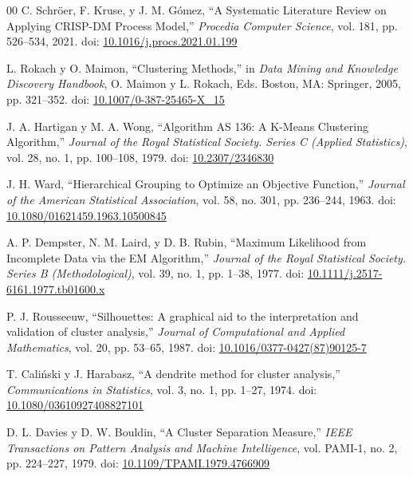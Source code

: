 \documentclass[conference,10pt,letterpaper]{IEEEtran}
\begin{document}
\begin{thebibliography}{00}
 C. Schröer, F. Kruse, y J. M. Gómez, ``A Systematic Literature Review on Applying CRISP-DM Process Model,'' \textit{Procedia Computer Science}, vol. 181, pp. 526--534, 2021. doi: \href{https://doi.org/10.1016/j.procs.2021.01.199}{10.1016/j.procs.2021.01.199}

 L. Rokach y O. Maimon, ``Clustering Methods,'' in \textit{Data Mining and Knowledge Discovery Handbook}, O. Maimon y L. Rokach, Eds. Boston, MA: Springer, 2005, pp. 321--352. doi: \href{https://doi.org/10.1007/0-387-25465-X_15}{10.1007/0-387-25465-X\_15}

 J. A. Hartigan y M. A. Wong, ``Algorithm AS 136: A K-Means Clustering Algorithm,'' \textit{Journal of the Royal Statistical Society. Series C (Applied Statistics)}, vol. 28, no. 1, pp. 100--108, 1979. doi: \href{https://doi.org/10.2307/2346830}{10.2307/2346830}

 J. H. Ward, ``Hierarchical Grouping to Optimize an Objective Function,'' \textit{Journal of the American Statistical Association}, vol. 58, no. 301, pp. 236--244, 1963. doi: \href{https://doi.org/10.1080/01621459.1963.10500845}{10.1080/01621459.1963.10500845}

 A. P. Dempster, N. M. Laird, y D. B. Rubin, ``Maximum Likelihood from Incomplete Data via the EM Algorithm,'' \textit{Journal of the Royal Statistical Society. Series B (Methodological)}, vol. 39, no. 1, pp. 1--38, 1977. doi: \href{https://doi.org/10.1111/j.2517-6161.1977.tb01600.x}{10.1111/j.2517-6161.1977.tb01600.x}

 P. J. Rousseeuw, ``Silhouettes: A graphical aid to the interpretation and validation of cluster analysis,'' \textit{Journal of Computational and Applied Mathematics}, vol. 20, pp. 53--65, 1987. doi: \href{https://doi.org/10.1016/0377-0427(87)90125-7}{10.1016/0377-0427(87)90125-7}

 T. Cali\'nski y J. Harabasz, ``A dendrite method for cluster analysis,'' \textit{Communications in Statistics}, vol. 3, no. 1, pp. 1--27, 1974. doi: \href{https://doi.org/10.1080/03610927408827101}{10.1080/03610927408827101}

 D. L. Davies y D. W. Bouldin, ``A Cluster Separation Measure,'' \textit{IEEE Transactions on Pattern Analysis and Machine Intelligence}, vol. PAMI-1, no. 2, pp. 224--227, 1979. doi: \href{https://doi.org/10.1109/TPAMI.1979.4766909}{10.1109/TPAMI.1979.4766909}


\end{thebibliography}
\end{document}
